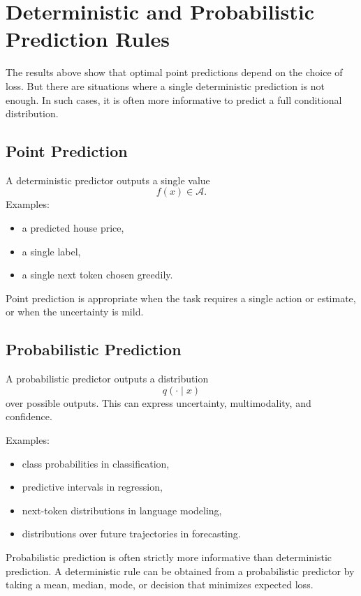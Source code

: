 \section{Deterministic and Probabilistic Prediction Rules}

The results above show that optimal point predictions depend on the choice of loss. But there are situations where a single deterministic prediction is not enough. In such cases, it is often more informative to predict a full conditional distribution.

\subsection{Point Prediction}

A deterministic predictor outputs a single value
\[
f(x)\in\mathcal{A}.
\]
Examples:
\begin{itemize}
    \item a predicted house price,
    \item a single label,
    \item a single next token chosen greedily.
\end{itemize}

Point prediction is appropriate when the task requires a single action or estimate, or when the uncertainty is mild.

\subsection{Probabilistic Prediction}

A probabilistic predictor outputs a distribution
\[
q(\cdot \mid x)
\]
over possible outputs. This can express uncertainty, multimodality, and confidence.

Examples:
\begin{itemize}
    \item class probabilities in classification,
    \item predictive intervals in regression,
    \item next-token distributions in language modeling,
    \item distributions over future trajectories in forecasting.
\end{itemize}

Probabilistic prediction is often strictly more informative than deterministic prediction. A deterministic rule can be obtained from a probabilistic predictor by taking a mean, median, mode, or decision that minimizes expected loss.


